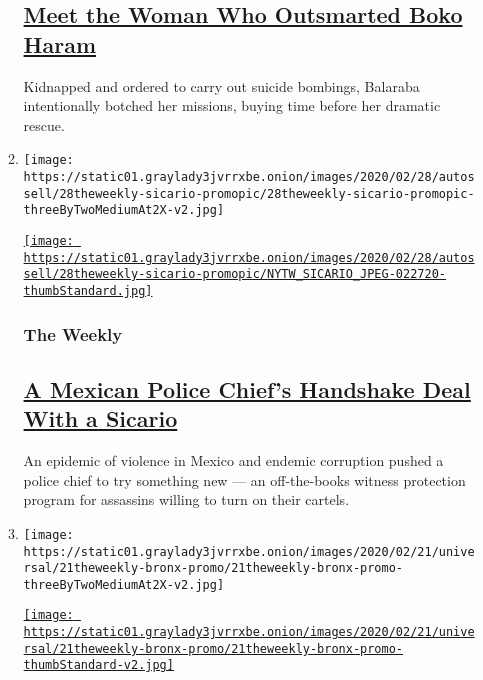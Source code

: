 \begin{enumerate}
\begin{enumerate}
    \hypertarget{meet-the-woman-who-outsmarted-boko-haram}{%
    \subsection{\texorpdfstring{\href{/2020/03/13/the-weekly/nigeria-boko-haram-girls-kidnapping.html}{Meet
    the Woman Who Outsmarted Boko
    Haram}}{Meet the Woman Who Outsmarted Boko Haram}}\label{meet-the-woman-who-outsmarted-boko-haram}}

    Kidnapped and ordered to carry out suicide bombings, Balaraba
    intentionally botched her missions, buying time before her dramatic
    rescue.
  \item
    \texttt{[image: https://static01.graylady3jvrrxbe.onion/images/2020/02/28/autossell/28theweekly-sicario-promopic/28theweekly-sicario-promopic-threeByTwoMediumAt2X-v2.jpg]}

    \href{/2020/02/28/the-weekly/mexico-cartels-police.html}{\texttt{[image: https://static01.graylady3jvrrxbe.onion/images/2020/02/28/autossell/28theweekly-sicario-promopic/NYTW\_SICARIO\_JPEG-022720-thumbStandard.jpg]}}

    \hypertarget{the-weekly-3}{%
    \subsubsection{The Weekly}\label{the-weekly-3}}

    \hypertarget{a-mexican-police-chiefs-handshake-deal-with-a-sicario}{%
    \subsection{\texorpdfstring{\href{/2020/02/28/the-weekly/mexico-cartels-police.html}{A
    Mexican Police Chief's Handshake Deal With a
    Sicario}}{A Mexican Police Chief's Handshake Deal With a Sicario}}\label{a-mexican-police-chiefs-handshake-deal-with-a-sicario}}

    An epidemic of violence in Mexico and endemic corruption pushed a
    police chief to try something new --- an off-the-books witness
    protection program for assassins willing to turn on their cartels.
  \item
    \texttt{[image: https://static01.graylady3jvrrxbe.onion/images/2020/02/21/universal/21theweekly-bronx-promo/21theweekly-bronx-promo-threeByTwoMediumAt2X-v2.jpg]}

    \href{/2020/02/21/the-weekly/child-abuse-willowbrook-union-ave-bronx-si.html}{\texttt{[image: https://static01.graylady3jvrrxbe.onion/images/2020/02/21/universal/21theweekly-bronx-promo/21theweekly-bronx-promo-thumbStandard-v2.jpg]}}


\end{enumerate}
\end{enumerate}

